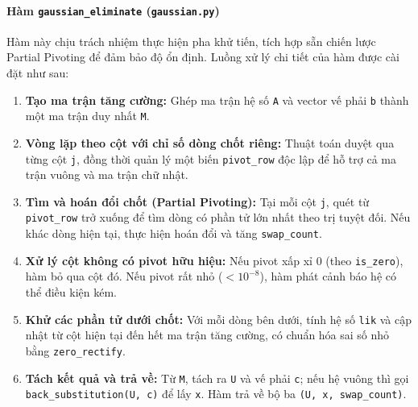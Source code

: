 \paragraph{Hàm \texttt{gaussian\_eliminate} (\texttt{gaussian.py})}
Hàm này chịu trách nhiệm thực hiện pha khử tiến, tích hợp sẵn chiến lược Partial Pivoting để đảm bảo độ ổn định. Luồng xử lý chi tiết của hàm được cài đặt như sau:
\begin{enumerate}
    \item \textbf{Tạo ma trận tăng cường:} Ghép ma trận hệ số \texttt{A} và vector vế phải \texttt{b} thành một ma trận duy nhất \texttt{M}.
    \item \textbf{Vòng lặp theo cột với chỉ số dòng chốt riêng:} Thuật toán duyệt qua từng cột \texttt{j}, đồng thời quản lý một biến \texttt{pivot\_row} độc lập để hỗ trợ cả ma trận vuông và ma trận chữ nhật.
    \item \textbf{Tìm và hoán đổi chốt (Partial Pivoting):} Tại mỗi cột \texttt{j}, quét từ \texttt{pivot\_row} trở xuống để tìm dòng có phần tử lớn nhất theo trị tuyệt đối. Nếu khác dòng hiện tại, thực hiện hoán đổi và tăng \texttt{swap\_count}.
    \item \textbf{Xử lý cột không có pivot hữu hiệu:} Nếu pivot xấp xỉ 0 (theo \texttt{is\_zero}), hàm bỏ qua cột đó. Nếu pivot rất nhỏ ($<10^{-8}$), hàm phát cảnh báo hệ có thể điều kiện kém.
    \item \textbf{Khử các phần tử dưới chốt:} Với mỗi dòng bên dưới, tính hệ số \texttt{lik} và cập nhật từ cột hiện tại đến hết ma trận tăng cường, có chuẩn hóa sai số nhỏ bằng \texttt{zero\_rectify}.
    \item \textbf{Tách kết quả và trả về:} Từ \texttt{M}, tách ra \texttt{U} và vế phải \texttt{c}; nếu hệ vuông thì gọi \texttt{back\_substitution(U, c)} để lấy \texttt{x}. Hàm trả về bộ ba \texttt{(U, x, swap\_count)}.
\end{enumerate}


